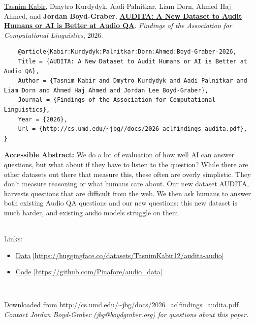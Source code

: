 \documentclass[a4paper]{article}
\begin{document}
    \underline{Tasnim Kabir}, Dmytro Kurdydyk, Aadi Palnitkar, Liam Dorn, Ahmed Haj Ahmed, and {\bf Jordan Boyd-Graber}.  {\bf \href{http://cs.umd.edu/~jbg//docs/2026_aclfindings_audita.pdf}{AUDITA: A New Dataset to Audit Humans or AI is Better at Audio QA}}.  \emph{Findings of the Association for Computational Linguistics}, 2026.



    \vspace{5cm}

    \begin{verbatim}
    @article{Kabir:Kurdydyk:Palnitkar:Dorn:Ahmed:Boyd-Graber-2026,
	Title = {AUDITA: A New Dataset to Audit Humans or AI is Better at Audio QA},
	Author = {Tasnim Kabir and Dmytro Kurdydyk and Aadi Palnitkar and Liam Dorn and Ahmed Haj Ahmed and Jordan Lee Boyd-Graber},
	Journal = {Findings of the Association for Computational Linguistics},
	Year = {2026},
	Url = {http://cs.umd.edu/~jbg//docs/2026_aclfindings_audita.pdf},
}

    \end{verbatim}

    {\bf Accessible Abstract:} We do a lot of evaluation of how well AI can answer questions, but what about if they have to listen to the question?  While there are other datasets out there that measure this, these often are overly simplistic.  They don't measure reasoning or what humans care about.  Our new dataset AUDITA, harvests questions that are difficult from the web.  We then ask humans to answer both existing Audio QA questions and our new questions: this new dataset is much harder, and existing audio models struggle on them.\\~

    

    \noindent Links:
\begin{itemize}
\item \href{https://huggingface.co/datasets/TasnimKabir12/audita-audio}{Data} [\url{https://huggingface.co/datasets/TasnimKabir12/audita-audio}]
\item \href{https://github.com/Pinafore/audio_data}{Code} [\url{https://github.com/Pinafore/audio_data}]

\end{itemize}\

    \vspace{3cm}
    Downloaded from \url{http://cs.umd.edu/~jbg/docs/2026_aclfindings_audita.pdf}  \\

    \vspace{2cm}
    \textit{Contact Jordan Boyd-Graber (jbg@boydgraber.org) for questions about this paper.}

    

    
\end{document}
